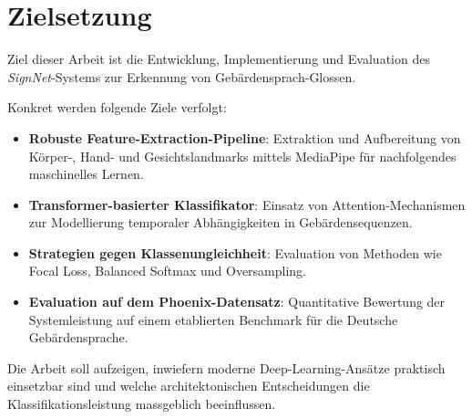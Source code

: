 \section{Zielsetzung}
Ziel dieser Arbeit ist die Entwicklung, Implementierung und Evaluation des \textit{SignNet}-Systems zur Erkennung von Gebärdensprach-Glossen.

Konkret werden folgende Ziele verfolgt:

\begin{itemize}
    \item \textbf{Robuste Feature-Extraction-Pipeline}: Extraktion und Aufbereitung von Körper-, Hand- und Gesichtslandmarks mittels MediaPipe für nachfolgendes maschinelles Lernen.
    \item \textbf{Transformer-basierter Klassifikator}: Einsatz von Attention-Mechanismen zur Modellierung temporaler Abhängigkeiten in Gebärdensequenzen.
    \item \textbf{Strategien gegen Klassenungleichheit}: Evaluation von Methoden wie Focal Loss, Balanced Softmax und Oversampling.
    \item \textbf{Evaluation auf dem Phoenix-Datensatz}: Quantitative Bewertung der Systemleistung auf einem etablierten Benchmark für die Deutsche Gebärdensprache.
\end{itemize}

Die Arbeit soll aufzeigen, inwiefern moderne Deep-Learning-Ansätze praktisch einsetzbar sind und welche architektonischen Entscheidungen die Klassifikationsleistung massgeblich beeinflussen.
